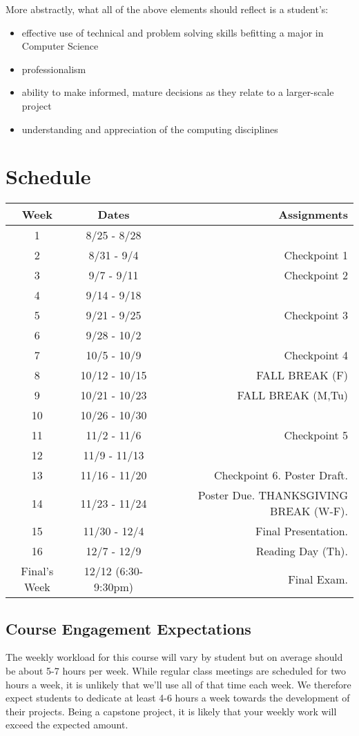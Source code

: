 \documentclass[10pt]{article}
\begin{document}
More abstractly, what all of the above elements should reflect is a student's: 
\begin{itemize}
\item effective use of technical and problem solving skills befitting a major in Computer Science
\item professionalism
\item ability to make informed, mature decisions as they relate to a larger-scale project
\item understanding and appreciation of the computing disciplines
\end{itemize}

\section{Schedule}

\begin{center}
\begin{tabular}{|c|c|r|}
\hline 
Week & Dates & Assignments \\
\hline
1 & 8/25 - 8/28 &  \\
\hline 
2 & 8/31 - 9/4 &   Checkpoint 1\\
\hline
3 & 9/7 - 9/11 &   Checkpoint 2\\
\hline
4 & 9/14 - 9/18 &  \\
\hline
5 & 9/21 - 9/25 &  Checkpoint 3\\
\hline
6 & 9/28 - 10/2 &  \\
\hline
7 & 10/5 - 10/9  &  Checkpoint 4\\
\hline 
8 & 10/12 - 10/15 &  FALL BREAK (F) \\
\hline
9 & 10/21 - 10/23 & FALL BREAK (M,Tu) \\
\hline
10 & 10/26 - 10/30 &  \\
\hline
11 & 11/2 - 11/6 &  Checkpoint 5\\
\hline
12 & 11/9 - 11/13 &  \\
\hline
13 & 11/16 - 11/20 & Checkpoint 6. Poster Draft.\\
\hline
14 & 11/23 - 11/24 &  Poster Due. THANKSGIVING BREAK (W-F).   \\
\hline
15 & 11/30 - 12/4 & Final Presentation. \\ 
\hline
16 & 12/7 - 12/9 &   Reading Day (Th). \\
\hline
Final's Week & 12/12 (6:30-9:30pm) & Final Exam. \\ 
\hline
\end{tabular}
\end{center}

\subsection{Course Engagement Expectations}

The weekly workload for this course will vary by student but on average should be about 5-7 hours per week.  While regular class meetings are scheduled for two hours a week, it is unlikely that we'll use all of that time each week.  We therefore expect students to dedicate at least 4-6 hours a week towards the development of their projects.  Being a capstone project, it is likely that your weekly work will exceed the expected amount.
\end{document}
